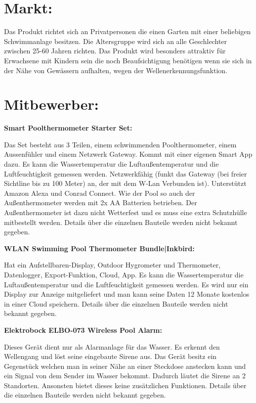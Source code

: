 
\section{Markt:}
Das Produkt richtet sich an Privatpersonen 
die einen Garten mit einer beliebigen Schwimmanlage besitzen. 
Die Altersgruppe wird sich an alle Geschlechter zwischen 25-60 Jahren richten. 
Das Produkt wird besonders attraktiv für Erwachsene 
mit Kindern sein die noch Beaufsichtigung benötigen wenn sie sich
in der Nähe von Gewässern aufhalten, wegen der Wellenerkennungsfunktion.
\section{Mitbewerber:}
\textbf{Smart Poolthermometer Starter Set:}


Das Set besteht aus 3 Teilen, einem schwimmenden Poolthermometer, 
einem Aussenfühler und einem Netzwerk Gateway. Kommt mit einer eigenen Smart App dazu. 
Es kann die Wassertemperatur die Luftaußentemperatur und die Luftfeuchtigkeit gemessen werden.
Netzwerkfähig (funkt das Gateway (bei freier Sichtline bis zu 100 Meter) an, 
der mit dem W-Lan Verbunden ist). Unterstützt Amazon Alexa und Conrad Connect. 
Wie der Pool so auch der Außenthermometer werden mit 2x AA Batterien betrieben. 
Der Außenthermometer ist dazu nicht Wetterfest und es muss eine extra Schutzhülle 
mitbestellt werden. Details über die einzelnen Bauteile werden nicht bekannt gegeben.


\textbf{WLAN Swimming Pool Thermometer Bundle|Inkbird:}


Hat ein Aufstellbaren-Display, Outdoor Hygrometer und Thermometer, 
Datenlogger, Export-Funktion, Cloud, App. 
Es kann die Wassertemperatur die Luftaußentemperatur und die Luftfeuchtigkeit gemessen werden.
Es wird nur ein Display zur Anzeige mitgeliefert und man 
kann seine Daten 12 Monate kostenlos in einer Cloud speichern.
Details über die einzelnen Bauteile werden nicht bekannt gegeben.

\newpage
\textbf{Elektrobock ELBO-073 Wireless Pool Alarm:}


Dieses Gerät dient nur als Alarmanlage für das Wasser. 
Es erkennt den Wellengang und löst seine eingebaute Sirene aus. 
Das Gerät besitz ein Gegenstück welchen man in seiner Nähe an einer Steckdose anstecken 
kann und ein Signal von dem Sender im Wasser bekommt. 
Dadurch läutet die Sirene an 2 Standorten. Ansonsten bietet dieses keine zusätzlichen Funktionen.
Details über die einzelnen Bauteile werden nicht bekannt gegeben.

